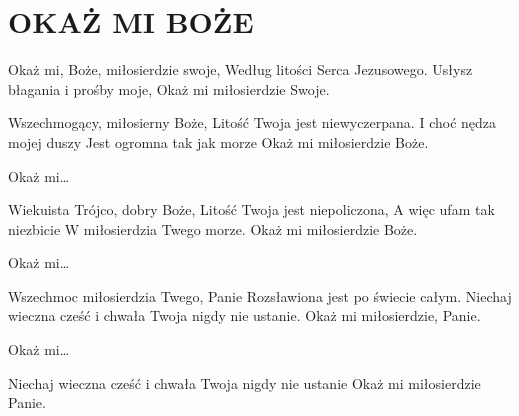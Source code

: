 \documentclass[../../../songbook.tex]{subfiles}
\begin{document}
\TabPositions{8cm} %
\section*{OKAŻ MI BOŻE}
{}
\vspace{0.5cm}
\-\hspace{1cm} Okaż mi, Boże, miłosierdzie swoje,	  \newline
\-\hspace{1cm} Według litości Serca Jezusowego.		   \newline
\-\hspace{1cm} Usłysz błagania i prośby moje,		  \newline
\-\hspace{1cm} Okaż mi miłosierdzie Swoje. 		 \newline

Wszechmogący, miłosierny Boże,			 \newline
Litość Twoja jest niewyczerpana.		   \newline
I choć nędza mojej duszy 				 \newline
Jest ogromna tak jak morze				 \newline
Okaż mi miłosierdzie Boże.				  \newline

\-\hspace{1cm} Okaż mi…			\newline

Wiekuista Trójco, dobry Boże,		\newline
Litość Twoja jest niepoliczona,		\newline
A więc ufam tak niezbicie 		\newline
W miłosierdzia Twego morze.		\newline
Okaż mi miłosierdzie Boże.		\newline

\-\hspace{1cm} Okaż mi…		\newline

Wszechmoc miłosierdzia Twego, Panie 		\newline
Rozsławiona jest po świecie całym.		\newline
Niechaj wieczna cześć i chwała 		\newline
Twoja nigdy nie ustanie.		\newline
Okaż mi miłosierdzie, Panie.		\newline

\-\hspace{1cm} Okaż mi…		\newline

Niechaj wieczna cześć i chwała		\newline
Twoja nigdy nie ustanie		\newline
Okaż mi miłosierdzie Panie.		\newline
\end{document}
